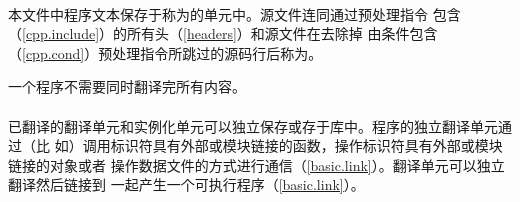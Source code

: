 \paragraph{} %
本文件中程序文本保存于称为的单元中。源文件连同通过预处理指令
包含（\ref{cpp.include}）的所有头（\ref{headers}）和源文件在去除掉
由条件包含（\ref{cpp.cond}）预处理指令所跳过的源码行后称为。

\begin{note}
一个\cpp{}程序不需要同时翻译完所有内容。
\end{note}

\paragraph{} %
\begin{note}
  已翻译的翻译单元和实例化单元可以独立保存或存于库中。程序的独立翻译单元通过（比
  如）调用标识符具有外部或模块链接的函数，操作标识符具有外部或模块链接的对象或者
  操作数据文件的方式进行通信（\ref{basic.link}）。翻译单元可以独立翻译然后链接到
  一起产生一个可执行程序（\ref{basic.link}）。
\end{note}

